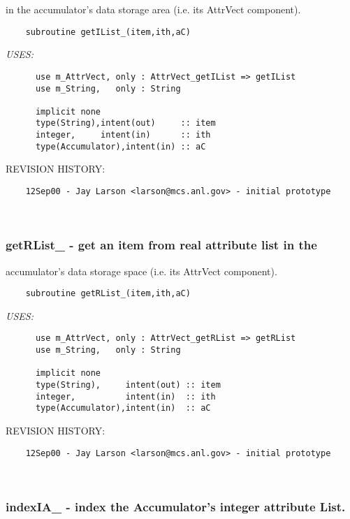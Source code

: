   in the accumulator's data storage area (i.e. its AttrVect component).
 
 
\begin{verbatim} 
    subroutine getIList_(item,ith,aC)\end{verbatim}{\em USES:}
\begin{verbatim}      use m_AttrVect, only : AttrVect_getIList => getIList
      use m_String,   only : String
 
      implicit none
      type(String),intent(out)     :: item
      integer,     intent(in)      :: ith
      type(Accumulator),intent(in) :: aC
 \end{verbatim}{\sf REVISION HISTORY:}
\begin{verbatim}  	12Sep00 - Jay Larson <larson@mcs.anl.gov> - initial prototype\end{verbatim}
 
 
\mbox{}\hrulefill\ 
 

 \subsubsection{getRList\_ - get an item from real attribute list in the}


  accumulator's data storage space (i.e. its AttrVect component).
 
 
\begin{verbatim} 
    subroutine getRList_(item,ith,aC)\end{verbatim}{\em USES:}
\begin{verbatim}      use m_AttrVect, only : AttrVect_getRList => getRList
      use m_String,   only : String
 
      implicit none
      type(String),     intent(out) :: item
      integer,          intent(in)  :: ith
      type(Accumulator),intent(in)  :: aC
 \end{verbatim}{\sf REVISION HISTORY:}
\begin{verbatim}  	12Sep00 - Jay Larson <larson@mcs.anl.gov> - initial prototype\end{verbatim}
 
 
\mbox{}\hrulefill\ 
 

 \subsubsection{indexIA\_ - index the Accumulator's integer attribute List.}


